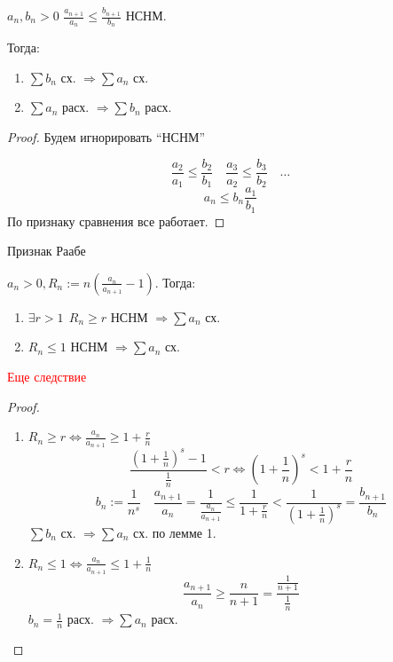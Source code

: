 \begin{lemma}
    $a_n, b_n > 0$ $\frac{a_{n+1}}{a_n} \le \frac{b_{n+1}}{b_n}$ НСНМ.

    Тогда:
    \begin{enumerate}
        \item $\sum b_n$ сх. $\Rightarrow \sum a_n$ сх.
        \item $\sum a_n$ расх. $\Rightarrow \sum b_n$ расх.
    \end{enumerate}
\end{lemma}
\begin{proof}
    Будем игнорировать ``НСНМ''

    $$\frac{a_2}{a_1}\leq\frac{b_2}{b_1} \quad \frac{a_3}{a_2} \leq \frac{b_3}{b_2} \quad \ldots$$
    $$a_n\leq b_n \frac{a_1}{b_1}$$
    По признаку сравнения все работает.
\end{proof}

\begin{theorem}
    Признак Раабе

    $a_n > 0, R_n:=n\left( \frac{a_n}{a_{n+1}} - 1 \right)$. Тогда:
    \begin{enumerate}
        \item $\exists r > 1 \ \ R_n\geq r$ НСНМ $\Rightarrow \sum a_n$ сх.
        \item $R_n\leq 1$ НСНМ $\Rightarrow \sum a_n$ сх.
    \end{enumerate}
\end{theorem}

\textcolor{red}{Еще следствие}

\begin{proof}
    \begin{enumerate}
        \item $R_n\geq r\Leftrightarrow \frac{a_n}{a_{n+1}}\ge 1 + \frac{r}{n}$
        $$\frac{\left(1+\frac{1}{n}\right)^s - 1}{\frac{1}{n}}<r \Leftrightarrow \left(1+\frac{1}{n}\right)^s < 1 + \frac{r}{n}$$
        $$b_n:=\frac{1}{n^s} \quad \frac{a_{n+1}}{a_n}=\frac{1}{\frac{a_n}{a_{n+1}}}\leq \frac{1}{1+\frac{r}{n}} < \frac{1}{\left(1+\frac{1}{n}\right)^s}=\frac{b_{n+1}}{b_n}$$
        $\sum b_n$ сх. $\Rightarrow \sum a_n$ сх. по лемме 1.
        \item $R_n \le 1 \Leftrightarrow \frac{a_n}{a_{n+1}} \le 1 + \frac{1}{n}$
        $$\frac{a_{n+1}}{a_n}\geq \frac{n}{n+1}=\frac{\frac{1}{n+1}}{\frac{1}{n}}$$
        $b_n=\frac{1}{n}$ расх. $\Rightarrow \sum a_n$ расх.
    \end{enumerate}
\end{proof}

